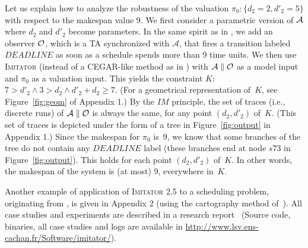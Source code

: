\documentclass{llncs}
\newcommand{\A}{\mathcal{A}}
\newcommand{\Ko}{K}
\newcommand{\pio}{\pi_0}
\newcommand{\IM}{\mathit{IM}}
\newcommand{\imitator}{\textsc{Imitator}}
\begin{document}
Let us explain how to analyze the robustness of the
valuation $\pio:\{d_2=2,d'_2=5\}$ with respect to the makespan value 9.
We first consider a parametric version of ${\cal A}$ where
$d_2$ and $d'_2$ become parameters.
In the same spirit as in \cite{cpr08},
we add an observer ${\cal O}$, which is a TA
synchronized with $\A$, that fires a transition labeled $\mathit{DEADLINE}$ as soon as a schedule spends more than 9 time units.
We then use \imitator{} (instead of a CEGAR-like method
as in \cite{cpr08}) with $\A \parallel {\cal O}$ as a model input
and $\pio$ as a valuation input.
This yields the constraint $\Ko$:  $7 > d'_2 \wedge 3 > d_2 \wedge d'_2 + d_2 \geq 7$.
(For a geometrical representation of~$\Ko$, see Figure~\ref{fig:geom} of Appendix 1.)
By the $\IM$ principle, the set of traces (i.e., discrete runs) of
$\A \parallel {\cal O}$ is always the same,
for any point $(d_2,d'_2)$ of~$\Ko$.
(This set of traces is depicted under the form of a tree in Figure~\ref{fig:output} in Appendix 1.)
Since the makespan for $\pio$ is~9,
we know that some branches of the tree do not contain
any $\mathit{DEADLINE}$ label (these branches end at node $s73$
in Figure~\ref{fig:output}).
This holds for each point $(d_2,d'_2)$ of~$\Ko$.
In other words, the makespan of the system is  (at most) 9, everywhere in~$\Ko$. 


Another example of application of \imitator{} 2.5 to a scheduling problem, originating from \cite{bb04}, is given in Appendix 2 (using 
the cartography method of~\cite{af10}). 
All case studies and experiments %
are described in a research report~\cite{soulat12} (Source code, binaries, all case studies and logs are available in \url{http://www.lsv.ens-cachan.fr/Software/imitator/}).
\end{document}
